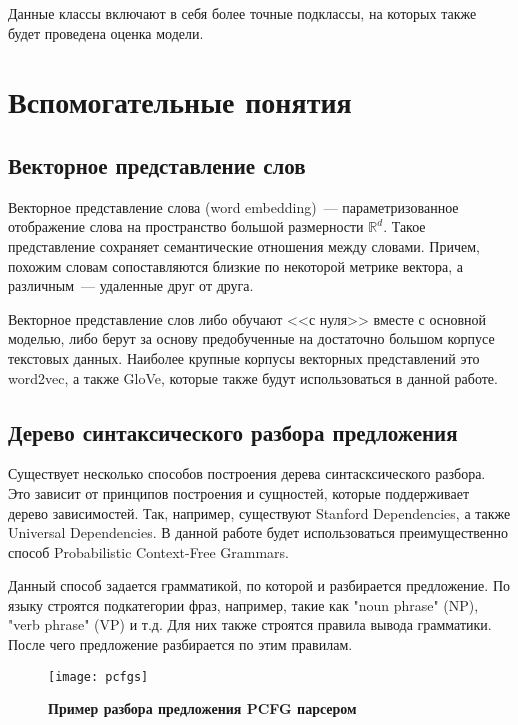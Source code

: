 Данные классы включают в себя более точные подклассы, на которых также будет проведена оценка модели.

\section{Вспомогательные понятия}

\subsection{Векторное представление слов}
Векторное представление слова (word embedding)\cite{Bengio03aneural}~--- параметризованное отображение слова на пространство большой размерности $\mathbb{R}^d$. 
Такое представление сохраняет семантические отношения между словами. 
Причем, похожим словам сопоставляются близкие по некоторой метрике вектора, 
а различным~--- удаленные друг от друга.

Векторное представление слов либо обучают <<с нуля>> вместе с основной моделью, либо берут за основу предобученные на достаточно большом корпусе текстовых данных. Наиболее крупные корпусы векторных представлений это word2vec\cite{DBLP:journals/corr/MikolovLS13, wor2vec}, а также GloVe\cite{pennington2014glove, glove}, которые также будут использоваться в данной работе.

\subsection{Дерево синтаксического разбора предложения}
Существует несколько способов построения дерева синтасксического разбора.
Это зависит от принципов построения и сущностей, которые поддерживает дерево зависимостей.
Так, например, существуют Stanford Dependencies\cite{standeps}, а также Universal Dependencies\cite{unideps}.
В данной работе будет использоваться преимущественно способ Probabilistic Context-Free Grammars\cite{pcfg}.

Данный способ задается грамматикой, по которой и разбирается предложение\cite{Klein03accurateunlexicalized}.
По языку строятся подкатегории фраз, например, такие как "noun phrase" (NP), "verb phrase" (VP) и т.д. 
Для них также строятся правила вывода грамматики. После чего предложение разбирается по этим правилам. 

\begin{figure}[h]
\texttt{[image: pcfgs]}
\caption{\textbf{Пример разбора предложения PCFG парсером}}
\label{fig:pcfgs}
\end{figure}


